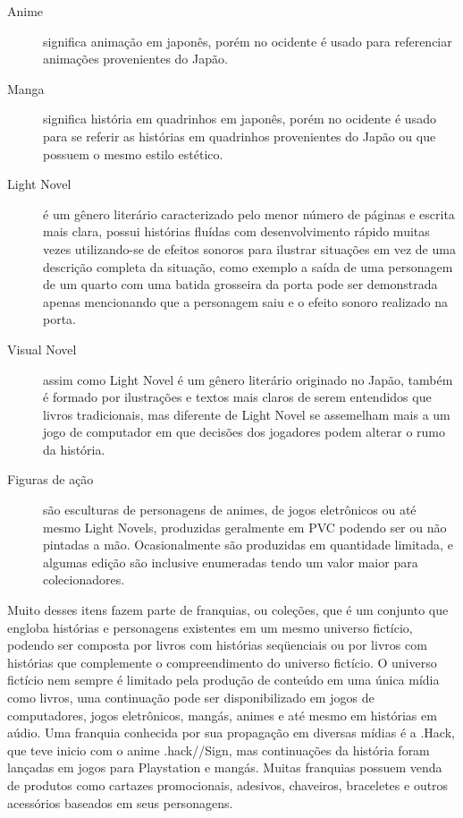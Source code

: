 \documentclass[12pt]{article}
\begin{document}
\begin{description}
\item[Anime] significa animação em japonês, porém no ocidente é usado para referenciar animações provenientes do Japão.
\item[Manga] significa história em quadrinhos em japonês, porém no ocidente é usado para se referir as histórias em quadrinhos provenientes do Japão ou que possuem o mesmo estilo estético.
\item[Light Novel] é um gênero literário caracterizado pelo menor número de páginas e escrita mais clara, possui histórias fluídas com desenvolvimento rápido muitas vezes utilizando-se de efeitos sonoros para ilustrar situações em vez de uma descrição completa da situação, como exemplo a saída de uma personagem de um quarto com uma batida grosseira da porta pode ser demonstrada apenas mencionando que a personagem saiu e o efeito sonoro realizado na porta.
\item[Visual Novel] assim como Light Novel é um gênero literário originado no Japão, também é formado por ilustrações e textos mais claros de serem entendidos que livros tradicionais, mas diferente de Light Novel se assemelham mais a um jogo de computador em que decisões dos jogadores podem alterar o rumo da história.
\item[Figuras de ação] são esculturas de personagens de animes, de jogos eletrônicos ou até mesmo Light Novels, produzidas geralmente em PVC podendo ser ou não pintadas a mão. Ocasionalmente são produzidas em quantidade limitada, e algumas edição são inclusive enumeradas tendo um valor maior para colecionadores.
\end{description}


Muito desses itens fazem parte de franquias, ou coleções, que é um conjunto que engloba histórias e personagens existentes em um mesmo universo fictício, podendo ser composta por livros com histórias seqüenciais ou por livros com histórias que complemente o compreendimento do universo fictício. O universo fictício nem sempre é limitado pela produção de conteúdo em uma única mídia como livros, uma continuação pode ser disponibilizado em jogos de computadores, jogos eletrônicos, mangás, animes e até mesmo em histórias em aúdio. Uma franquia conhecida por sua propagação em diversas mídias é a .Hack, que teve inicio com o anime .hack//Sign, mas continuações da história foram lançadas em jogos para Playstation e mangás. Muitas franquias possuem venda de produtos como cartazes promocionais, adesivos, chaveiros, braceletes e outros acessórios baseados em seus personagens.
\end{document}
